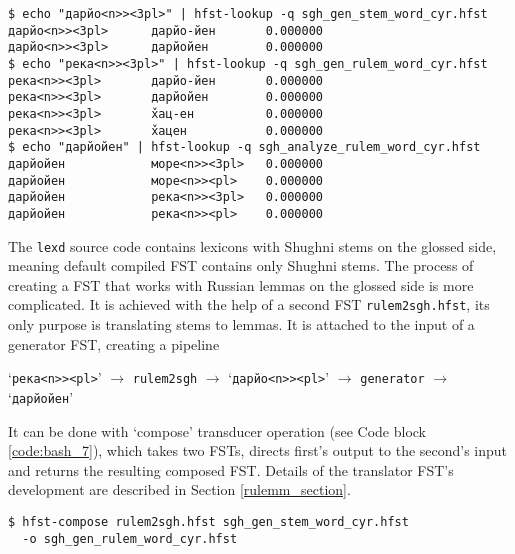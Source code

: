 \begin{code_frame}[float]
    \begin{footnotesize}\codespacing
    \begin{verbatim}
$ echo "дарйо<n>><3pl>" | hfst-lookup -q sgh_gen_stem_word_cyr.hfst
дарйо<n>><3pl>      дарйо-йен       0.000000
дарйо<n>><3pl>      дарйойен        0.000000
$ echo "река<n>><3pl>" | hfst-lookup -q sgh_gen_rulem_word_cyr.hfst
река<n>><3pl>       дарйо-йен       0.000000
река<n>><3pl>       дарйойен        0.000000
река<n>><3pl>       х̌ац-ен          0.000000
река<n>><3pl>       х̌ацен           0.000000
$ echo "дарйойен" | hfst-lookup -q sgh_analyze_rulem_word_cyr.hfst
дарйойен            море<n>><3pl>   0.000000
дарйойен            море<n>><pl>    0.000000
дарйойен            река<n>><3pl>   0.000000
дарйойен            река<n>><pl>    0.000000
    \end{verbatim}
    \end{footnotesize}
    \tcblower
    \label{code:pipeline_3}
\end{code_frame}

The \texttt{lexd} source code contains lexicons with Shughni stems on the glossed side, meaning default compiled FST contains only Shughni stems. The process of creating a FST that works with Russian lemmas on the glossed side is more complicated. It is achieved with the help of a second FST \texttt{rulem2sgh.hfst}, its only purpose is translating stems to lemmas. It is attached to the input of a generator FST, creating a pipeline 

\begin{center}
\noindent `\texttt{река<n>><pl>}' $\rightarrow$ \texttt{rulem2sgh} $\rightarrow$ `\texttt{дарйо<n>><pl>}' $\rightarrow$ \texttt{generator} $\rightarrow$ `\texttt{дарйойен}'\\
\end{center}


It can be done with `compose' transducer operation (see Code block \ref{code:bash_7}), which takes two FSTs, directs first's output to the second's input and returns the resulting composed FST. Details of the translator FST's development are described in Section \ref{rulemm_section}.

\begin{code_frame}[float]
    \begin{footnotesize}\codespacing
    \begin{verbatim}
$ hfst-compose rulem2sgh.hfst sgh_gen_stem_word_cyr.hfst
  -o sgh_gen_rulem_word_cyr.hfst
    \end{verbatim}
    \end{footnotesize}
    \tcblower
    \label{code:bash_7}
\end{code_frame}

